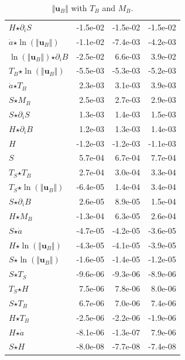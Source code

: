 \begin{table}[H]
\begin{tabular}{l|r|r|r}
  $H$$ \star $$\partial_i S$ & -1.5e-02 & -1.5e-02 & -1.5e-02 \\
  $\dot{a}$$ \star $$\ln\left( \Vert \mathbf{u}_B \Vert \right)$ & -1.1e-02 & -7.4e-03 & -4.2e-03 \\
  \color{red}$\ln\left( \Vert \mathbf{u}_B \Vert \right)$$ \star $$\partial_i B$ & \color{red}-2.5e-02 & \color{red}6.6e-03 & \color{red}3.9e-02 \\
  $T_B$$ \star $$\ln\left( \Vert \mathbf{u}_B \Vert \right)$ & -5.5e-03 & -5.3e-03 & -5.2e-03 \\
  $\dot{a}$$ \star $$T_B$ & 2.3e-03 & 3.1e-03 & 3.9e-03 \\
  $S$$ \star $$M_B$ & 2.5e-03 & 2.7e-03 & 2.9e-03 \\
  $S$$ \star $$\partial_i S$ & 1.3e-03 & 1.4e-03 & 1.5e-03 \\
  $H$$ \star $$\partial_i B$ & 1.2e-03 & 1.3e-03 & 1.4e-03 \\
  $H$ & -1.2e-03 & -1.2e-03 & -1.1e-03 \\
  $S$ & 5.7e-04 & 6.7e-04 & 7.7e-04 \\
  $T_S$$ \star $$T_B$ & 2.7e-04 & 3.0e-04 & 3.3e-04 \\
  \color{red}$T_S$$ \star $$\ln\left( \Vert \mathbf{u}_B \Vert \right)$ & \color{red}-6.4e-05 & \color{red}1.4e-04 & \color{red}3.4e-04 \\
  $S$$ \star $$\partial_i B$ & 2.6e-05 & 8.9e-05 & 1.5e-04 \\
  \color{red}$H$$ \star $$M_B$ & \color{red}-1.3e-04 & \color{red}6.3e-05 & \color{red}2.6e-04 \\
  $S$$ \star $$\dot{a}$ & -4.7e-05 & -4.2e-05 & -3.6e-05 \\
  $H$$ \star $$\ln\left( \Vert \mathbf{u}_B \Vert \right)$ & -4.3e-05 & -4.1e-05 & -3.9e-05 \\
  $S$$ \star $$\ln\left( \Vert \mathbf{u}_B \Vert \right)$ & -1.6e-05 & -1.4e-05 & -1.2e-05 \\
  $S$$ \star $$T_S$ & -9.6e-06 & -9.3e-06 & -8.9e-06 \\
  $T_S$$ \star $$H$ & 7.5e-06 & 7.8e-06 & 8.0e-06 \\
  $S$$ \star $$T_B$ & 6.7e-06 & 7.0e-06 & 7.4e-06 \\
  $H$$ \star $$T_B$ & -2.5e-06 & -2.2e-06 & -1.9e-06 \\
  \color{red}$H$$ \star $$\dot{a}$ & \color{red}-8.1e-06 & \color{red}-1.3e-07 & \color{red}7.9e-06 \\
  $S$$ \star $$H$ & -8.0e-08 & -7.7e-08 & -7.4e-08 \\
\end{tabular}
  \caption[]{\normalsize $\Vert \mathbf{u}_B \Vert$ with $T_B$ and $M_B$.}
\end{table}

